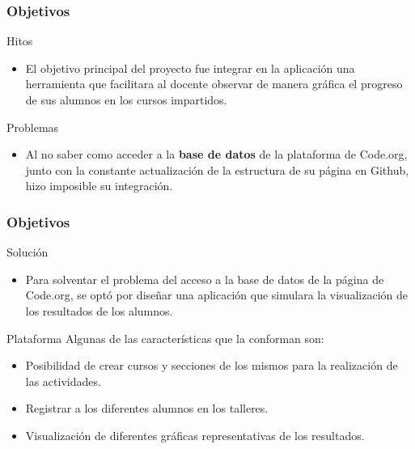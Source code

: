 \documentclass{beamer}
\begin{document}
\begin{frame}

\frametitle{Objetivos }

\begin{block}{Hitos}
  \begin{itemize}
  \item
   El objetivo principal del proyecto fue integrar en la aplicación una herramienta que facilitara al docente observar de manera gráfica el progreso de sus alumnos
   en los cursos impartidos.

  \end{itemize}
\end{block}

\begin{alertblock}{Problemas}
    \begin{itemize}
        \item Al no saber como acceder a la \textbf{base de datos} de la plataforma de Code.org, junto con la constante actualización de la estructura de su página en Github, hizo imposible su integración.
    \end{itemize}
\end{alertblock}

\end{frame}
\begin{frame}

\frametitle{Objetivos }

\begin{exampleblock}{Solución}
    \begin{itemize}
        \item Para solventar el problema del acceso a la base de datos de la página de Code.org, se optó por diseñar una aplicación que simulara la visualización de los resultados
        de los alumnos.
    \end{itemize}
\end{exampleblock}

\begin{block}{Plataforma}
    Algunas de las características que la conforman son:
    \begin{itemize}
        \item Posibilidad de crear cursos y secciones de los mismos para la realización de las actividades.
        \item Registrar a los diferentes alumnos en los talleres.
        \item Visualización de diferentes gráficas representativas de los resultados.
    \end{itemize}
\end{block}

\end{frame}
\end{document}
